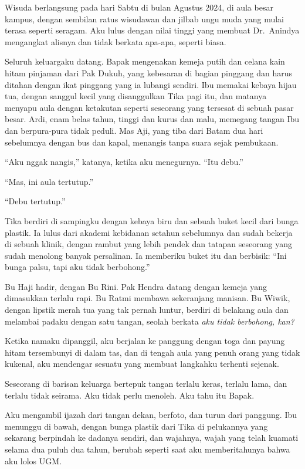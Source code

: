 \documentclass[11pt,twoside,openany]{book}
\makeatletter
\newcommand{\scenebreak}{\par\vspace{0.9em}{\centering\textsc{*\hspace{0.7em}*\hspace{0.7em}*}\par}\vspace{0.9em}\@afterindentfalse\@afterheading}
\makeatother
\begin{document}
\scenebreak
Wisuda berlangsung pada hari Sabtu di bulan Agustus 2024, di aula besar kampus, dengan sembilan ratus wisudawan dan jilbab ungu muda yang mulai terasa seperti seragam. Aku lulus dengan nilai tinggi yang membuat Dr.~Anindya mengangkat alisnya dan tidak berkata apa-apa, seperti biasa.

Seluruh keluargaku datang. Bapak mengenakan kemeja putih dan celana kain hitam pinjaman dari Pak Dukuh, yang kebesaran di bagian pinggang dan harus ditahan dengan ikat pinggang yang ia lubangi sendiri. Ibu memakai kebaya hijau tua, dengan sanggul kecil yang disanggulkan Tika pagi itu, dan matanya menyapu aula dengan ketakutan seperti seseorang yang tersesat di sebuah pasar besar. Ardi, enam belas tahun, tinggi dan kurus dan malu, memegang tangan Ibu dan berpura-pura tidak peduli. Mas Aji, yang tiba dari Batam dua hari sebelumnya dengan bus dan kapal, menangis tanpa suara sejak pembukaan.

``Aku nggak nangis,'' katanya, ketika aku menegurnya. ``Itu debu.''

``Mas, ini aula tertutup.''

``Debu tertutup.''

Tika berdiri di sampingku dengan kebaya biru dan sebuah buket kecil dari bunga plastik. Ia lulus dari akademi kebidanan setahun sebelumnya dan sudah bekerja di sebuah klinik, dengan rambut yang lebih pendek dan tatapan seseorang yang sudah menolong banyak persalinan. Ia memberiku buket itu dan berbisik: ``Ini bunga palsu, tapi aku tidak berbohong.''

Bu Haji hadir, dengan Bu Rini. Pak Hendra datang dengan kemeja yang dimasukkan terlalu rapi. Bu Ratmi membawa sekeranjang manisan. Bu Wiwik, dengan lipstik merah tua yang tak pernah luntur, berdiri di belakang aula dan melambai padaku dengan satu tangan, seolah berkata \emph{aku tidak berbohong, kan?}

Ketika namaku dipanggil, aku berjalan ke panggung dengan toga dan payung hitam tersembunyi di dalam tas, dan di tengah aula yang penuh orang yang tidak kukenal, aku mendengar sesuatu yang membuat langkahku terhenti sejenak.

Seseorang di barisan keluarga bertepuk tangan terlalu keras, terlalu lama, dan terlalu tidak seirama. Aku tidak perlu menoleh. Aku tahu itu Bapak.

Aku mengambil ijazah dari tangan dekan, berfoto, dan turun dari panggung. Ibu menunggu di bawah, dengan bunga plastik dari Tika di pelukannya yang sekarang berpindah ke dadanya sendiri, dan wajahnya, wajah yang telah kuamati selama dua puluh dua tahun, berubah seperti saat aku memberitahunya bahwa aku lolos UGM.
\end{document}

